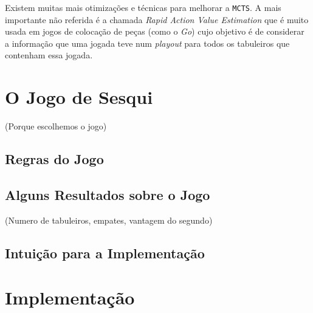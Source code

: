 \documentclass[12pt,a4paper,oneside]{article}
\begin{document}
Existem muitas mais otimizações e técnicas para melhorar a
\texttt{MCTS}. A mais importante não referida é a chamada
\textit{Rapid Action Value Estimation} que é muito usada em jogos de
colocação de peças (como o \textit{Go}) cujo objetivo é de considerar
a informação que uma jogada teve num \textit{playout} para todos os
tabuleiros que contenham essa jogada.



\section{O Jogo de Sesqui}
\label{sec:sesqui}

(Porque escolhemos o jogo)

\lipsum[1]

\subsection{Regras do Jogo}

\lipsum[1]

\lipsum[2]

\lipsum[3]

\subsection{Alguns Resultados sobre o Jogo}

(Numero de tabuleiros, empates, vantagem do segundo)

\lipsum[1]

\lipsum[2]

\subsection{Intuição para a Implementação}

\lipsum[1]

\lipsum[2]


\section{Implementação}
\label{sec:imp}
\end{document}
